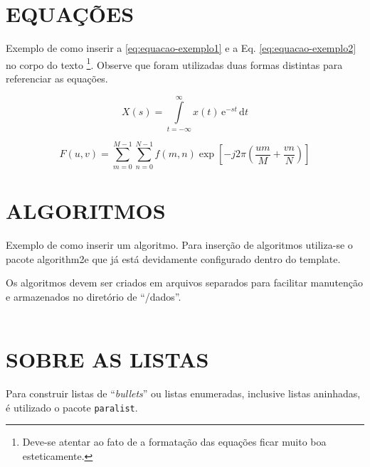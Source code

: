 

\chapter{EQUAÇÕES}
\label{chap:equacoes}

Exemplo de como inserir a \autoref{eq:equacao-exemplo1} e a Eq. \ref{eq:equacao-exemplo2} no corpo do texto \footnote{Deve-se atentar ao fato de a formatação das equações ficar muito boa esteticamente.}. Observe que foram utilizadas duas formas distintas para referenciar as equações.

\begin{equation}
    X(s) = \int\limits_{t=-\infty}^{\infty} x(t)\,\mathrm{e}^{-st}\,\mathrm{d}t
    \label{eq:equacao-exemplo1}
\end{equation}

\begin{equation}
    F(u, v) = \sum_{m = 0}^{M - 1} \sum_{n = 0}^{N - 1} f(m, n) \exp \left[ -j 2 \pi \left( \frac{u m}{M} + \frac{v n}{N} \right) \right]
    \label{eq:equacao-exemplo2}
\end{equation}

\chapter{ALGORITMOS}
\label{chap:algoritmos}

Exemplo de como inserir um algoritmo. Para inserção de algoritmos utiliza-se o pacote {\ttfamily algorithm2e} que já está devidamente configurado dentro do template.

Os algoritmos devem ser criados em arquivos separados para facilitar manutenção e armazenados no diretório de ``/dados''.\\
\\



\chapter{SOBRE AS LISTAS}
\label{chap:apSobreLista}

Para construir listas de ``\textit{bullets}''{} ou listas enumeradas, inclusive listas aninhadas, é utilizado o pacote \verb|paralist|.


